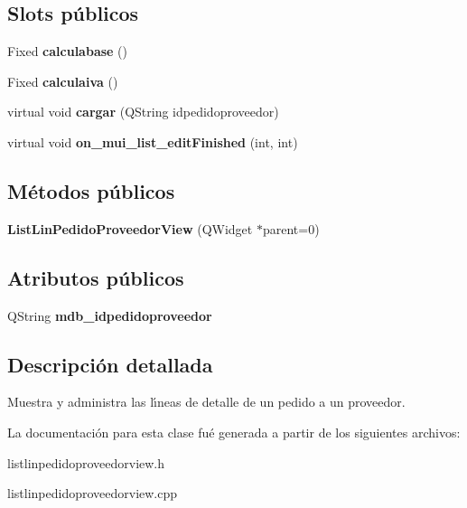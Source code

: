 \subsection*{Slots p\'{u}blicos}
\begin{CompactItemize}
\item 
Fixed {\bf calculabase} ()\label{classListLinPedidoProveedorView_i0}

\item 
Fixed {\bf calculaiva} ()\label{classListLinPedidoProveedorView_i1}

\item 
virtual void {\bf cargar} (QString idpedidoproveedor)\label{classListLinPedidoProveedorView_i2}

\item 
virtual void {\bf on\_\-mui\_\-list\_\-edit\-Finished} (int, int)\label{classListLinPedidoProveedorView_i3}

\end{CompactItemize}
\subsection*{M\'{e}todos p\'{u}blicos}
\begin{CompactItemize}
\item 
{\bf List\-Lin\-Pedido\-Proveedor\-View} (QWidget $\ast$parent=0)\label{classListLinPedidoProveedorView_a0}

\end{CompactItemize}
\subsection*{Atributos p\'{u}blicos}
\begin{CompactItemize}
\item 
QString {\bf mdb\_\-idpedidoproveedor}\label{classListLinPedidoProveedorView_o0}

\end{CompactItemize}


\subsection{Descripci\'{o}n detallada}
Muestra y administra las l\'{\i}neas de detalle de un pedido a un proveedor. 



La documentaci\'{o}n para esta clase fu\'{e} generada a partir de los siguientes archivos:\begin{CompactItemize}
\item 
listlinpedidoproveedorview.h\item 
listlinpedidoproveedorview.cpp\end{CompactItemize}
